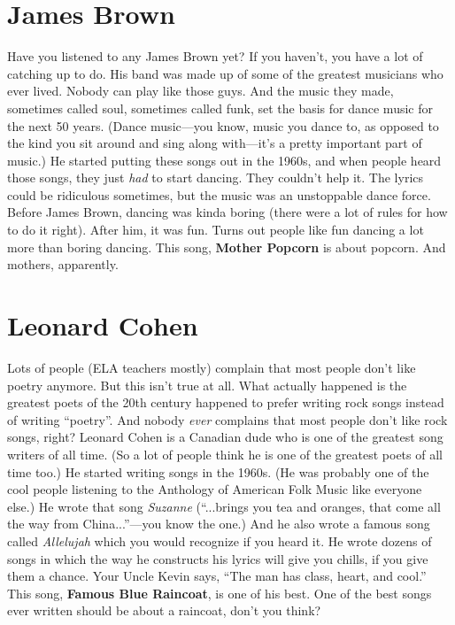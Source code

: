 \documentclass[letterpaper,single]{article}
\begin{document}
\section{James Brown}
Have you listened to any James Brown yet? 
If you haven't, you have a lot of catching up to do. 
His band was made up of some of the greatest musicians who ever lived. 
Nobody can play like those guys. 
And the music they made, sometimes called soul, sometimes called funk, set the basis for dance music for the next 50 years. 
(Dance music---you know, music you dance to, as opposed to the kind you sit around and sing along with---it's a pretty important part of music.) 
He started putting these songs out in the 1960s, and when people heard those songs, they just \emph{had} to start dancing. 
They couldn't help it. 
The lyrics could be ridiculous sometimes, but the music was an unstoppable dance force.
Before James Brown, dancing was kinda boring (there were a lot of rules for how to do it right). 
After him, it was fun. 
Turns out people like fun dancing a lot more than boring dancing.
This song, \textbf{Mother Popcorn} is about popcorn. And mothers, apparently.

\section{Leonard Cohen}
Lots of people (ELA teachers mostly) complain that most people don't like poetry anymore. 
But this isn't true at all. 
What actually happened is the greatest poets of the 20th century happened to prefer writing rock songs instead of writing ``poetry''. 
And nobody \emph{ever} complains that most people don't like rock songs, right? 
Leonard Cohen is a Canadian dude who is one of the greatest song writers of all time. 
(So a lot of people think he is one of the greatest poets of all time too.) 
He started writing songs in the 1960s. 
(He was probably one of the cool people listening to the Anthology of American Folk Music like everyone else.) 
He wrote that song \emph{Suzanne} (``...brings you tea and oranges, that come all the way from China...''---you know the one.) 
And he also wrote a famous song called \emph{Allelujah} which you would recognize if you heard it. 
He wrote dozens of songs in which the way he constructs his lyrics will give you chills, if you give them a chance. 
Your Uncle Kevin says, ``The man has class, heart, and cool.''
This song, \textbf{Famous Blue Raincoat}, is one of his best.
One of the best songs ever written should be about a raincoat, don't you think?
\end{document}

